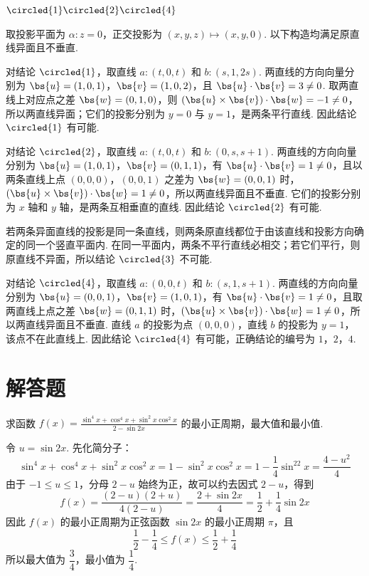 \begin{answer}
\(\circled{1}\circled{2}\circled{4}\)
\end{answer}

\begin{solution}
取投影平面为 \(\alpha:z=0\)，正交投影为 \((x,y,z)\mapsto(x,y,0)\). 以下构造均满足原直线异面且不垂直.

对结论 \(\circled{1}\)，取直线 \(a:(t,0,t)\) 和 \(b:(s,1,2s)\).
两直线的方向向量分别为 \(\bs{u}=(1,0,1)\)，\(\bs{v}=(1,0,2)\)，且 \(\bs{u}\cdot\bs{v}=3\ne0\). 取两直线上对应点之差 \(\bs{w}=(0,1,0)\)，则 \((\bs{u}\times\bs{v})\cdot\bs{w}=-1\ne0\)，所以两直线异面；它们的投影分别为 \(y=0\) 与 \(y=1\)，是两条平行直线. 因此结论 \(\circled{1}\) 有可能.

对结论 \(\circled{2}\)，取直线 \(a:(t,0,t)\) 和 \(b:(0,s,s+1)\).
两直线的方向向量分别为 \(\bs{u}=(1,0,1)\)，\(\bs{v}=(0,1,1)\)，有 \(\bs{u}\cdot\bs{v}=1\ne0\)，且以两条直线上点 \((0,0,0)\)，\((0,0,1)\) 之差为 \(\bs{w}=(0,0,1)\) 时，\((\bs{u}\times\bs{v})\cdot\bs{w}=1\ne0\)，所以两直线异面且不垂直. 它们的投影分别为 \(x\) 轴和 \(y\) 轴，是两条互相垂直的直线. 因此结论 \(\circled{2}\) 有可能.

若两条异面直线的投影是同一条直线，则两条原直线都位于由该直线和投影方向确定的同一个竖直平面内. 在同一平面内，两条不平行直线必相交；若它们平行，则原直线不异面，所以结论 \(\circled{3}\) 不可能.

对结论 \(\circled{4}\)，取直线 \(a:(0,0,t)\) 和 \(b:(s,1,s+1)\).
两直线的方向向量分别为 \(\bs{u}=(0,0,1)\)，\(\bs{v}=(1,0,1)\)，有 \(\bs{u}\cdot\bs{v}=1\ne0\)，且取两直线上点之差 \(\bs{w}=(0,1,1)\) 时，\((\bs{u}\times\bs{v})\cdot\bs{w}=1\ne0\)，所以两直线异面且不垂直. 直线 \(a\) 的投影为点 \((0,0,0)\)，直线 \(b\) 的投影为 \(y=1\)，该点不在此直线上. 因此结论 \(\circled{4}\) 有可能，正确结论的编号为 \(1\)，\(2\)，\(4\).
\end{solution}

\section{解答题}
\begin{problem}
求函数 \( f(x) = \frac{\sin^4 x + \cos^4 x + \sin^2 x \cos^2 x}{2 - \sin 2x} \) 的最小正周期，最大值和最小值.
\end{problem}

\begin{solution}
令 \(u=\sin2x\). 先化简分子：
\[
\sin^4x+\cos^4x+\sin^2x\cos^2x=1-\sin^2x\cos^2x=1-\frac14\sin^22x=\frac{4-u^2}{4}
\]
由于 \(-1\leqslant u\leqslant1\)，分母 \(2-u\) 始终为正，故可以约去因式 \(2-u\)，得到
\[
f(x)=\frac{(2-u)(2+u)}{4(2-u)}=\frac{2+\sin2x}{4}=\frac12+\frac14\sin2x
\]
因此 \(f(x)\) 的最小正周期为正弦函数 \(\sin2x\) 的最小正周期 \(\pi\)，且
\[
\frac12-\frac14\leqslant f(x)\leqslant\frac12+\frac14
\]
所以最大值为 \(\dfrac34\)，最小值为 \(\dfrac14\).
\end{solution}

